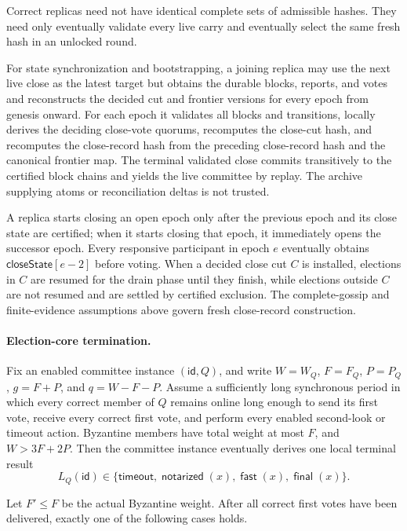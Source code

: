\documentclass[sigplan,twocolumn,review,anonymous]{acmart}
\newcommand{\func}[1]{\operatorname{\mathsf{#1}}}
\newcommand{\id}{\mathsf{id}}
\newcommand{\timeoutOutcome}{\mathsf{timeout}}
\newcommand{\notarized}{\func{notarized}}
\newcommand{\fast}{\func{fast}}
\newcommand{\final}{\func{final}}
\newcommand{\closeState}{\mathsf{closeState}}
\begin{document}
Correct replicas need not have identical complete sets of admissible hashes.  They need only
eventually validate every live carry and eventually select the same fresh hash in an unlocked round.

For state synchronization and bootstrapping, a joining replica may use the next live close as the latest
target but obtains the durable blocks, reports, and votes and reconstructs the decided cut and frontier
versions for every epoch from genesis onward.  For each epoch it validates all blocks and transitions,
locally derives the deciding close-vote quorums, recomputes the close-cut hash, and recomputes the
close-record hash from the preceding close-record hash and the canonical frontier map.  The terminal
validated close commits transitively to the certified block chains and yields the live committee by
replay.  The archive supplying atoms or reconciliation deltas is not trusted.

A replica starts closing an open epoch only after the previous epoch and its close state are
certified; when it starts closing that epoch, it immediately opens the successor epoch.  Every
responsive participant in epoch \(e\) eventually obtains \(\closeState[e-2]\) before voting.  When
a decided close cut \(C\) is installed, elections in \(C\) are resumed for the drain phase until
they finish, while elections outside \(C\) are not resumed and are settled by certified exclusion.  The complete-gossip and finite-evidence assumptions above govern fresh close-record construction.

\paragraph{Election-core termination.}
Fix an enabled committee instance \((\id,Q)\), and write
\(W=W_Q\), \(F=F_Q\), \(P=P_Q\), \(g=F+P\), and \(q=W-F-P\).
Assume a sufficiently long synchronous period in which every correct member of \(Q\) remains
online long enough to send its first vote, receive every correct first vote, and perform every enabled
second-look or timeout action.  Byzantine members have total weight at most \(F\), and
\(W>3F+2P\).  Then the committee instance eventually derives one local terminal result
\[
L_Q(\id)\in\{\timeoutOutcome,\notarized(x),\fast(x),\final(x)\}.
\]

Let \(F'\le F\) be the actual Byzantine weight.  After all correct first votes have been delivered,
exactly one of the following cases holds.
\end{document}
